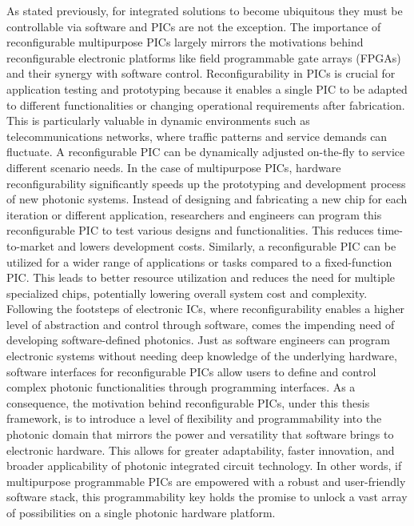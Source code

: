 As stated previously, for integrated solutions to become ubiquitous they must be controllable via software and PICs are not the exception.
The importance of reconfigurable multipurpose PICs largely mirrors the motivations behind reconfigurable electronic platforms like field programmable gate arrays (FPGAs) and their synergy with software control.
Reconfigurability in PICs is crucial for application testing and prototyping because it enables a single PIC to be adapted to different functionalities or changing operational requirements after fabrication.
This is particularly valuable in dynamic environments such as telecommunications networks, where traffic patterns and service demands can fluctuate.
A reconfigurable PIC can be dynamically adjusted on-the-fly to service different scenario needs.
In the case of multipurpose PICs, hardware reconfigurability significantly speeds up the prototyping and development process of new photonic systems.
Instead of designing and fabricating a new chip for each iteration or different application, researchers and engineers can program this reconfigurable PIC to test various designs and functionalities.
This reduces time-to-market and lowers development costs.
Similarly, a reconfigurable PIC can be utilized for a wider range of applications or tasks compared to a fixed-function PIC.
This leads to better resource utilization and reduces the need for multiple specialized chips, potentially lowering overall system cost and complexity.
Following the footsteps of electronic ICs, where reconfigurability enables a higher level of abstraction and control through software, comes the impending need of developing software-defined photonics.
Just as software engineers can program electronic systems without needing deep knowledge of the underlying hardware, software interfaces for reconfigurable PICs allow users to define and control complex photonic functionalities through programming interfaces.
As a consequence, the motivation behind reconfigurable PICs, under this thesis framework, is to introduce a level of flexibility and programmability into the photonic domain that mirrors the power and versatility that software brings to electronic hardware.
This allows for greater adaptability, faster innovation, and broader applicability of photonic integrated circuit technology.
In other words, if multipurpose programmable PICs are empowered with a robust and user-friendly software stack, this programmability key holds the promise to unlock a vast array of possibilities on a single photonic hardware platform.

